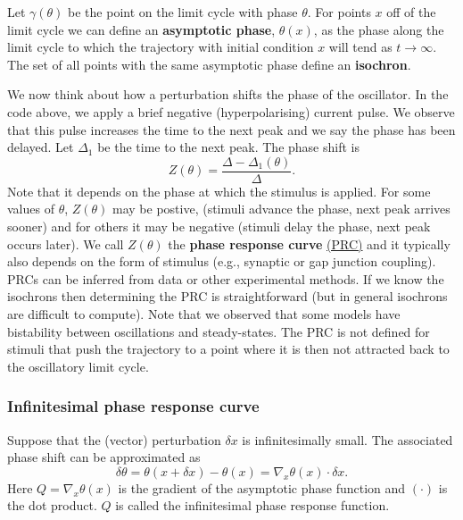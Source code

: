 \documentclass[11pt]{article}
\begin{document}
Let \(\gamma(\theta)\) be the point on the limit cycle with phase
\(\theta\). For points \(x\) off of the limit cycle we can define an
\textbf{asymptotic phase}, \(\theta(x)\), as the phase along the limit
cycle to which the trajectory with initial condition \(x\) will tend as
\(t \to \infty\). The set of all points with the same asymptotic phase
define an \textbf{isochron}.


We now think about how a perturbation shifts the phase of the
oscillator. In the code above, we apply a brief negative
(hyperpolarising) current pulse. We observe that this pulse increases
the time to the next peak and we say the phase has been delayed. Let
\(\Delta_1\) be the time to the next peak. The phase shift is
\[Z(\theta) = \frac{\Delta-\Delta_1(\theta)}{\Delta}.\] Note that it
depends on the phase at which the stimulus is applied. For some values
of \(\theta\), \(Z(\theta)\) may be postive, (stimuli advance the phase,
next peak arrives sooner) and for others it may be negative (stimuli
delay the phase, next peak occurs later). We call \(Z(\theta)\) the
\textbf{phase response curve}
\href{https://en.wikipedia.org/wiki/Phase_response_curve}{(PRC)} and it
typically also depends on the form of stimulus (e.g., synaptic or gap
junction coupling). PRCs can be inferred from data or other experimental
methods. If we know the isochrons then determining the PRC is
straightforward (but in general isochrons are difficult to compute).
Note that we observed that some models have bistability between
oscillations and steady-states. The PRC is not defined for stimuli that
push the trajectory to a point where it is then not attracted back to
the oscillatory limit cycle.

    \hypertarget{infinitesimal-phase-response-curve}{%
\subsubsection{Infinitesimal phase response
curve}\label{infinitesimal-phase-response-curve}}

Suppose that the (vector) perturbation \(\delta x\) is infinitesimally
small. The associated phase shift can be approximated as
\[\delta \theta = \theta(x + \delta x) - \theta(x) = \nabla_x \theta(x) \cdot \delta x.\]
Here \(Q =\nabla_x \theta(x)\) is the gradient of the asymptotic phase
function and \((\cdot)\) is the dot product. \(Q\) is called the
infinitesimal phase response function.
\end{document}
